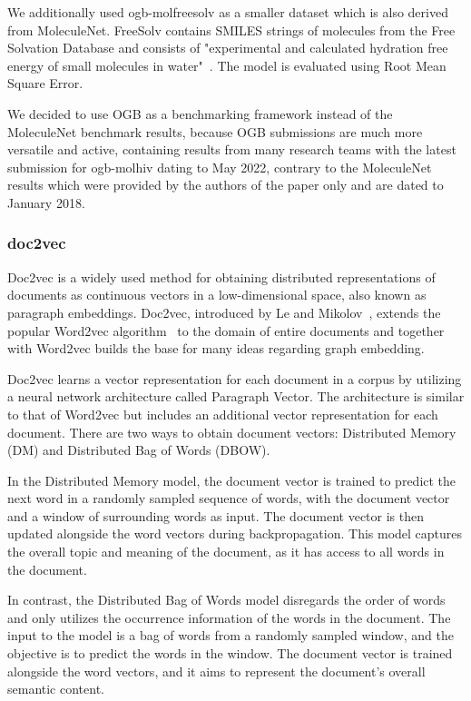 We additionally used ogb-molfreesolv as a smaller dataset which is also derived from MoleculeNet. FreeSolv contains SMILES strings of molecules from the Free Solvation Database and consists of "experimental and calculated hydration free energy of small molecules in water"~\cite{2018moleculenet}. The model is evaluated using Root Mean Square Error.

We decided to use OGB as a benchmarking framework instead of the MoleculeNet benchmark results, because OGB submissions are much more versatile and active, containing results from many research teams with the latest submission for ogb-molhiv dating to May 2022, contrary to the MoleculeNet results which were provided by the authors of the paper only and are dated to January 2018.

\subsubsection{doc2vec}
Doc2vec is a widely used method for obtaining distributed representations of documents as continuous vectors in a low-dimensional space, also known as paragraph embeddings. Doc2vec, introduced by Le and Mikolov~\cite{2014doc2vec}, extends the popular Word2vec algorithm~\cite{mikolov2013distributed} to the domain of entire documents and together with Word2vec builds the base for many ideas regarding graph embedding.

Doc2vec learns a vector representation for each document in a corpus by utilizing a neural network architecture called Paragraph Vector. The architecture is similar to that of Word2vec but includes an additional vector representation for each document. There are two ways to obtain document vectors: Distributed Memory (DM) and Distributed Bag of Words (DBOW).

In the Distributed Memory model, the document vector is trained to predict the next word in a randomly sampled sequence of words, with the document vector and a window of surrounding words as input. The document vector is then updated alongside the word vectors during backpropagation. This model captures the overall topic and meaning of the document, as it has access to all words in the document.

In contrast, the Distributed Bag of Words model disregards the order of words and only utilizes the occurrence information of the words in the document. The input to the model is a bag of words from a randomly sampled window, and the objective is to predict the words in the window. The document vector is trained alongside the word vectors, and it aims to represent the document's overall semantic content.

